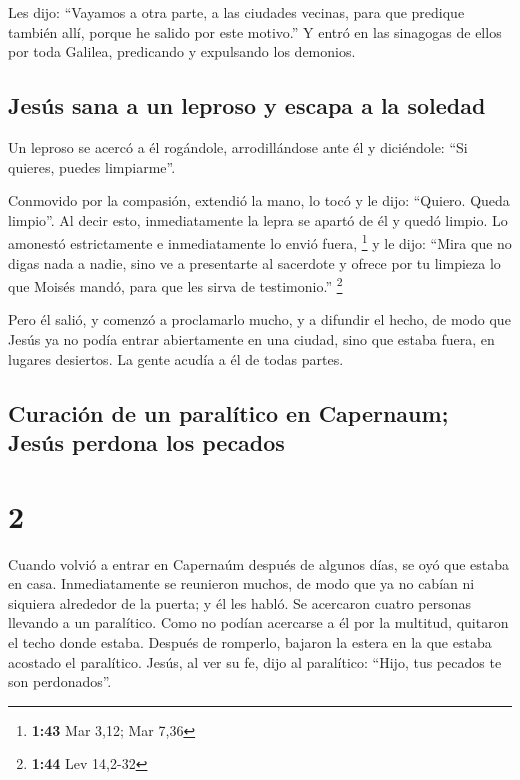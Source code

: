 Les dijo: ``Vayamos a otra parte, a las ciudades
vecinas, para que predique también allí, porque he salido por este
motivo.''  Y entró en las sinagogas de ellos por toda
Galilea, predicando y expulsando los demonios.

\hypertarget{jesuxfas-sana-a-un-leproso-y-escapa-a-la-soledad}{%
\subsection{Jesús sana a un leproso y escapa a la
soledad}\label{jesuxfas-sana-a-un-leproso-y-escapa-a-la-soledad}}

 Un leproso se acercó a él rogándole, arrodillándose ante
él y diciéndole: ``Si quieres, puedes limpiarme''.

 Conmovido por la compasión, extendió la mano, lo tocó y
le dijo: ``Quiero. Queda limpio''.  Al decir esto,
inmediatamente la lepra se apartó de él y quedó limpio. 
Lo amonestó estrictamente e inmediatamente lo envió fuera, \footnote{\textbf{1:43}
  Mar 3,12; Mar 7,36}  y le dijo: ``Mira que no digas
nada a nadie, sino ve a presentarte al sacerdote y ofrece por tu
limpieza lo que Moisés mandó, para que les sirva de testimonio.''
\footnote{\textbf{1:44} Lev 14,2-32}

 Pero él salió, y comenzó a proclamarlo mucho, y a
difundir el hecho, de modo que Jesús ya no podía entrar abiertamente en
una ciudad, sino que estaba fuera, en lugares desiertos. La gente acudía
a él de todas partes.

\hypertarget{curaciuxf3n-de-un-paraluxedtico-en-capernaum-jesuxfas-perdona-los-pecados}{%
\subsection{Curación de un paralítico en Capernaum; Jesús perdona los
pecados}\label{curaciuxf3n-de-un-paraluxedtico-en-capernaum-jesuxfas-perdona-los-pecados}}

\hypertarget{section-1}{%
\section{2}\label{section-1}}

 Cuando volvió a entrar en Capernaúm después de algunos
días, se oyó que estaba en casa.  Inmediatamente se
reunieron muchos, de modo que ya no cabían ni siquiera alrededor de la
puerta; y él les habló.  Se acercaron cuatro personas
llevando a un paralítico.  Como no podían acercarse a él
por la multitud, quitaron el techo donde estaba. Después de romperlo,
bajaron la estera en la que estaba acostado el paralítico.
 Jesús, al ver su fe, dijo al paralítico: ``Hijo, tus
pecados te son perdonados''.

